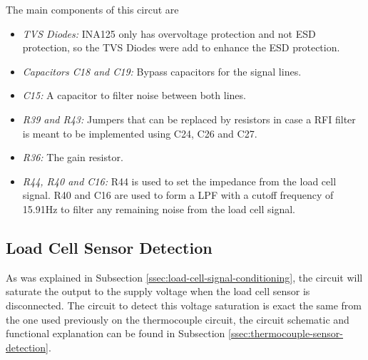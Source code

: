 	The main components of this circut are
	\begin{itemize}
		\item\textit{TVS Diodes:} INA125 only has overvoltage protection and not ESD protection, so the TVS Diodes were add to enhance the ESD protection.
		\item\textit{Capacitors C18 and C19:} Bypass capacitors for the signal lines.
		\item\textit{C15:} A capacitor to filter noise between both lines.
		\item\textit{R39 and R43:} Jumpers that can be replaced by resistors in case a RFI filter is meant to be implemented using C24, C26 and C27.
		\item\textit{R36:} The gain resistor.
		\item\textit{R44, R40 and C16:} R44 is used to set the impedance from the load cell signal. R40 and C16 are used to form a LPF with a cutoff frequency of 15.91Hz to filter any remaining noise from the load cell signal.
	\end{itemize}

\subsection{Load Cell Sensor Detection}\label{ssec:load-cell-sensor-detection}
	As was explained in Subsection \ref{ssec:load-cell-signal-conditioning}, the circuit will saturate the output to the supply voltage when the load cell sensor is disconnected. The circuit to detect this voltage saturation is exact the same from the one used previously on the thermocouple circuit, the circuit schematic and functional explanation can be found in Subsection \ref{ssec:thermocouple-sensor-detection}.